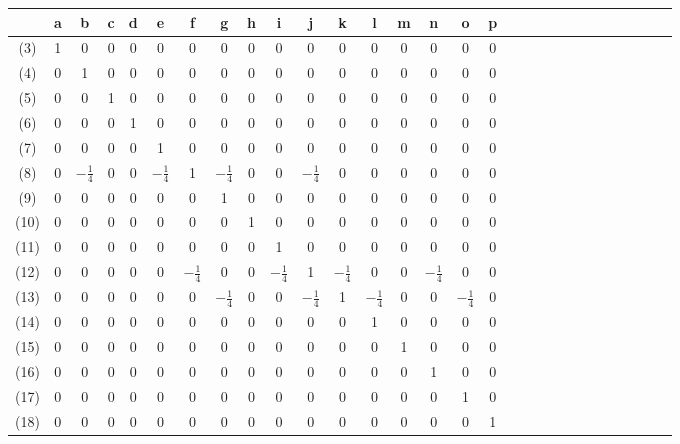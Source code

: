 \begin{center}
   \begin{tabular}{| c | c | c | c | c | c | c | c | c |c | c |c | c |c | c | c | c | c | c | c | c |c | c |c | c |c | c |c | c |}
     \hline
       & a  & b & c & d & e & f & g & h & i & j & k & l & m & n & o & p  \\ \hline
   (3) & 1  & 0 & 0 & 0 & 0 & 0 & 0 & 0 & 0 & 0 & 0 & 0 & 0 & 0 & 0 & 0 \\ \hline
   (4) & 0  & 1 & 0 & 0 & 0 & 0 & 0 & 0 & 0 & 0 & 0 & 0 & 0 & 0 & 0 & 0 \\ \hline
   (5) & 0  & 0 & 1 & 0 & 0 & 0 & 0 & 0 & 0 & 0 & 0 & 0 & 0 & 0 & 0 & 0 \\ \hline
   (6) & 0  & 0 & 0 & 1 & 0 & 0 & 0 & 0 & 0 & 0 & 0 & 0 & 0 & 0 & 0 & 0 \\ \hline
   (7) & 0  & 0 & 0 & 0 & 1 & 0 & 0 & 0 & 0 & 0 & 0 & 0 & 0 & 0 & 0 & 0 \\ \hline
   (8) & 0  & $-\frac{1}{4} $ & 0 & 0 & $-\frac{1}{4} $ & 1 & $-\frac{1}{4} $ & 0 & 0 & $-\frac{1}{4} $& 0 & 0 & 0 & 0 & 0 & 0 \\ \hline
   (9) & 0  & 0 & 0 & 0 & 0 & 0 & 1 & 0 & 0 & 0 & 0 & 0 & 0 & 0 & 0 & 0 \\ \hline
   (10) & 0  & 0 & 0 & 0 & 0 & 0 & 0 & 1 & 0 & 0 & 0 & 0 & 0 & 0 & 0 & 0 \\ \hline
   (11) & 0  & 0 & 0 & 0 & 0 & 0 & 0 & 0 & 1 & 0 & 0 & 0 & 0 & 0 & 0 & 0 \\ \hline
   (12) & 0  & 0 & 0 & 0 & 0 & $-\frac{1}{4} $ & 0 & 0 & $-\frac{1}{4} $ & 1 & $-\frac{1}{4} $ & 0 & 0 & $-\frac{1}{4} $ & 0 & 0 \\ \hline
   (13) & 0  & 0 & 0 & 0 & 0 & 0 & $-\frac{1}{4} $ & 0 & 0 & $-\frac{1}{4} $ & 1 & $-\frac{1}{4} $ & 0 & 0 & $-\frac{1}{4} $ & 0 \\ \hline
   (14) & 0  & 0 & 0 & 0 & 0 & 0 & 0 & 0 & 0 & 0 & 0 & 1 & 0 & 0 & 0 & 0 \\ \hline
   (15) & 0  & 0 & 0 & 0 & 0 & 0 & 0 & 0 & 0 & 0 & 0 & 0 & 1 & 0 & 0 & 0 \\ \hline
   (16) & 0  & 0 & 0 & 0 & 0 & 0 & 0 & 0 & 0 & 0 & 0 & 0 & 0 & 1 & 0 & 0 \\ \hline
   (17) & 0  & 0 & 0 & 0 & 0 & 0 & 0 & 0 & 0 & 0 & 0 & 0 & 0 & 0 & 1 & 0 \\ \hline
   (18) & 0  & 0 & 0 & 0 & 0 & 0 & 0 & 0 & 0 & 0 & 0 & 0 & 0 & 0 & 0 & 1 \\ \hline
   \end{tabular}
\end{center}

